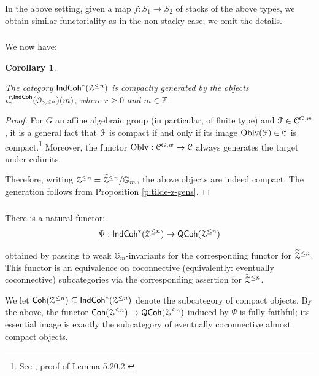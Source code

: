 \documentclass[reqno,11pt]{amsart}
\numberwithin{equation}{subsection}
\newtheorem{cor}[thm]{Corollary}
\theoremstyle{remark}
\newcommand{\bG}{{\mathbb G}}
\newcommand{\bZ}{{\mathbb Z}}
\newcommand{\sC}{{\EuScript C}}
\newcommand{\sF}{{\EuScript F}}
\newcommand{\sO}{{\EuScript O}}
\newcommand{\sZ}{{\EuScript Z}}
\newcommand{\on}{\operatorname}
\newcommand{\Oblv}{\on{Oblv}}
\newcommand{\Coh}{\mathsf{Coh}}
\newcommand{\IndCoh}{\mathsf{IndCoh}}
\newcommand{\QCoh}{\mathsf{QCoh}}
\renewcommand{\subset}{\subseteq}
\begin{document}
\subsubsection{}

In the above setting, given a map $f:S_1 \to S_2$ of stacks of the
above types, we obtain similar functoriality as in the non-stacky case;
we omit the details.  

\subsubsection{}

We now have:

\begin{cor}\label{c:z-gen}

The category $\IndCoh^*(\sZ^{\leq n})$ is compactly generated
by the objects $\iota_*^{r,\IndCoh}(\sO_{\sZ^{\leq n}})(m)$, where $r \geq 0$ and 
$m \in \bZ$.

\end{cor}

\begin{proof}

For $G$ an affine algebraic group (in particular, of finite type) and 
$\sF \in \sC^{G,w}$, it is a general fact that $\sF$ is compact
if and only if its image $\Oblv(\sF) \in \sC$ is compact.\footnote{See 
\cite{methods}, proof of Lemma 5.20.2.}
Moreover, the functor $\Oblv:\sC^{G,w} \to \sC$ always generates
the target under colimits. 

Therefore, writing $\sZ^{\leq n} = \widetilde{\sZ}^{\leq n}/\bG_m$, 
the above objects are indeed compact. The generation follows from 
Proposition \ref{p:tilde-z-gens}.

\end{proof}

\subsubsection{}

There is a natural functor:
%
\[
\Psi:\IndCoh^*(\sZ^{\leq n}) \to \QCoh(\sZ^{\leq n})
\]

\noindent obtained by passing to weak $\bG_m$-invariants for
the corresponding functor for $\widetilde{\sZ}^{\leq n}$. This functor
is an equivalence on coconnective (equivalently: eventually coconnective) 
subcategories via the corresponding assertion for $\widetilde{\sZ}^{\leq n}$.

We let $\Coh(\sZ^{\leq n}) \subset \IndCoh^*(\sZ^{\leq n})$ 
denote the subcategory of compact objects. By the above, 
the functor $\Coh(\sZ^{\leq n}) \to \QCoh(\sZ^{\leq n})$
induced by $\Psi$ is fully faithful; its essential image is 
exactly the subcategory of 
eventually coconnective almost compact objects. 
\end{document}
